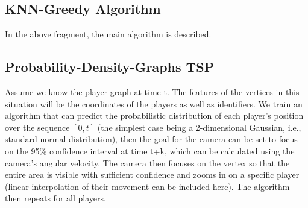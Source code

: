 \pagebreak
\subsection{KNN-Greedy Algorithm}



In the above fragment, the main algorithm is described. 

\subsection{Probability-Density-Graphs TSP}
Assume we know the player graph at time t. The features of the vertices in this situation will be the coordinates of the players as well as identifiers. We train an algorithm that can predict the probabilistic distribution of each player's position over the sequence $[0,t]$ (the simplest case being a 2-dimensional Gaussian, i.e., standard normal distribution), then the goal for the camera can be set to focus on the 95\% confidence interval at time t+k, which can be calculated using the camera's angular velocity. The camera then focuses on the vertex so that the entire area is visible with sufficient confidence and zooms in on a specific player (linear interpolation of their movement can be included here). The algorithm then repeats for all players.
